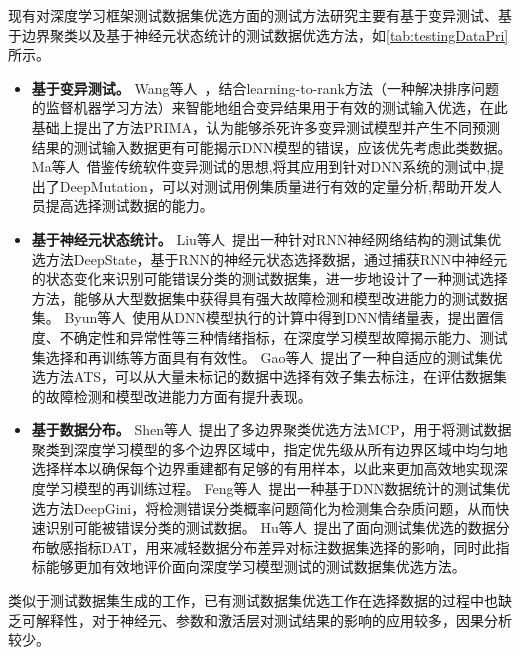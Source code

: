 现有对深度学习框架测试数据集优选方面的测试方法研究主要有基于变异测试、基于边界聚类以及基于神经元状态统计的测试数据优选方法，如\cref{tab:testingDataPri}所示。

\begin{itemize}

	\item \textbf{基于变异测试。}
	      Wang等人~，结合learning-to-rank方法（一种解决排序问题的监督机器学习方法）来智能地组合变异结果用于有效的测试输入优选，在此基础上提出了方法PRIMA，认为能够杀死许多变异测试模型并产生不同预测结果的测试输入数据更有可能揭示DNN模型的错误，应该优先考虑此类数据。
	      Ma等人~借鉴传统软件变异测试的思想,将其应用到针对DNN系统的测试中,提出了DeepMutation，可以对测试用例集质量进行有效的定量分析,帮助开发人员提高选择测试数据的能力。

	\item \textbf{基于神经元状态统计。}
	      Liu等人~提出一种针对RNN神经网络结构的测试集优选方法DeepState，基于RNN的神经元状态选择数据，通过捕获RNN中神经元的状态变化来识别可能错误分类的测试数据集，进一步地设计了一种测试选择方法，能够从大型数据集中获得具有强大故障检测和模型改进能力的测试数据集。
	      Byun等人~使用从DNN模型执行的计算中得到DNN情绪量表，提出置信度、不确定性和异常性等三种情绪指标，在深度学习模型故障揭示能力、测试集选择和再训练等方面具有有效性。
	      Gao等人~提出了一种自适应的测试集优选方法ATS，可以从大量未标记的数据中选择有效子集去标注，在评估数据集的故障检测和模型改进能力方面有提升表现。

	\item \textbf{基于数据分布。}
	      Shen等人~提出了多边界聚类优选方法MCP，用于将测试数据聚类到深度学习模型的多个边界区域中，指定优先级从所有边界区域中均匀地选择样本以确保每个边界重建都有足够的有用样本，以此来更加高效地实现深度学习模型的再训练过程。
	      Feng等人~提出一种基于DNN数据统计的测试集优选方法DeepGini，将检测错误分类概率问题简化为检测集合杂质问题，从而快速识别可能被错误分类的测试数据。
	      Hu等人~提出了面向测试集优选的数据分布敏感指标DAT，用来减轻数据分布差异对标注数据集选择的影响，同时此指标能够更加有效地评价面向深度学习模型测试的测试数据集优选方法。

\end{itemize}

类似于测试数据集生成的工作，已有测试数据集优选工作在选择数据的过程中也缺乏可解释性，对于神经元、参数和激活层对测试结果的影响的应用较多，因果分析较少。



